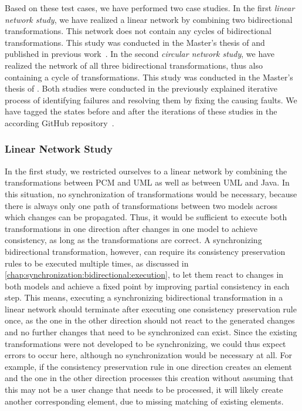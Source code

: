Based on these test cases, we have performed two case studies.
In the first \emph{linear network study}, we have realized a linear network by combining two bidirectional transformations. This network does not contain any cycles of bidirectional transformations.
This study was conducted in the Master's thesis of \textcite{syma2018ma} and published in previous work~.
In the second \emph{circular network study}, we have realized the network of all three bidirectional transformations, thus also containing a cycle of transformations.
This study was conducted in the Master's thesis of \textcite{saglam2020ma}.
Both studies were conducted in the previously explained iterative process of identifying failures and resolving them by fixing the causing faults.
We have tagged the states before and after the iterations of these studies in the according GitHub repository~\cite{vitruvCBSEGithub}.

\subsubsection*{Linear Network Study} 

In the first study, we restricted ourselves to a linear network by combining the transformations between \gls{PCM} and \gls{UML} as well as between \gls{UML} and Java.
In this situation, no synchronization of transformations would be necessary, because there is always only one path of transformations between two models across which changes can be propagated.
Thus, it would be sufficient to execute both transformations in one direction after changes in one model to achieve consistency, as long as the transformations are correct.
A synchronizing bidirectional transformation, however, can require its consistency preservation rules to be executed multiple times, as discussed in \autoref{chap:synchronization:bidirectional:execution}, to let them react to changes in both models and achieve a fixed point by improving partial consistency in each step.
This means, executing a synchronizing bidirectional transformation in a linear network should terminate after executing one consistency preservation rule once, as the one in the other direction should not react to the generated changes and no further changes that need to be synchronized can exist.
Since the existing transformations were not developed to be synchronizing, we could thus expect errors to occur here, although no synchronization would be necessary at all.
For example, if the consistency preservation rule in one direction creates an element and the one in the other direction processes this creation without assuming that this may not be a user change that needs to be processed, it will likely create another corresponding element, due to missing matching of existing elements.

